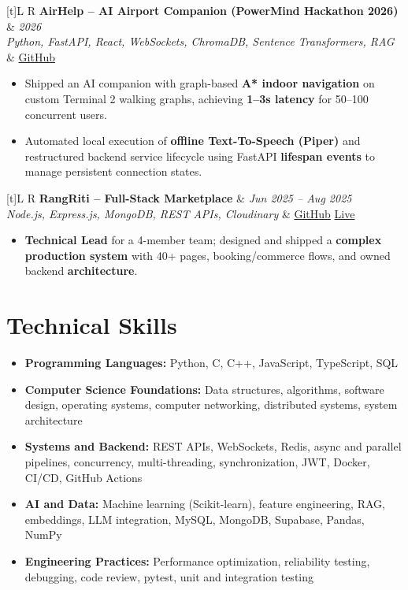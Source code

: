 \documentclass[a4paper,10pt]{article}
\newcommand{\resumeProject}[4]{
  \vspace{1mm}
  \noindent
  \begin{tabularx}{\textwidth}[t]{L R}
    \textbf{#1} & \textit{#3} \\
    \textit{#2} & #4 \\
  \end{tabularx}
  \vspace{-1mm}
}
\begin{document}
\resumeProject
  {AirHelp -- AI Airport Companion (PowerMind Hackathon 2026)}
  {Python, FastAPI, React, WebSockets, ChromaDB, Sentence Transformers, RAG}
  {2026}
  {\href{https://github.com/Ojas-Srivastava05/AirHelp-AI-Airport-Assistant}{GitHub}}
\begin{itemize}
  \item Shipped an AI companion with graph-based \textbf{A* indoor navigation} on custom Terminal 2 walking graphs, achieving \textbf{1--3s latency} for 50--100 concurrent users.
  \item Automated local execution of \textbf{offline Text-To-Speech (Piper)} and restructured backend service lifecycle using FastAPI \textbf{lifespan events} to manage persistent connection states.
\end{itemize}

\resumeProject
  {RangRiti -- Full-Stack Marketplace}
  {Node.js, Express.js, MongoDB, REST APIs, Cloudinary}
  {Jun 2025 -- Aug 2025}
  {\href{https://github.com/Ojas-Srivastava05/RangRiti}{GitHub} \textbar{} \href{https://rangriti.onrender.com/}{Live}}
\begin{itemize}
  \item \textbf{Technical Lead} for a 4-member team; designed and shipped a \textbf{complex production system} with 40+ pages, booking/commerce flows, and owned backend \textbf{architecture}.
\end{itemize}

\section{Technical Skills}
\small
\begin{itemize}[label={}]
  \item \textbf{Programming Languages:} Python, C, C++, JavaScript, TypeScript, SQL
  \item \textbf{Computer Science Foundations:} Data structures, algorithms, software design, operating systems, computer networking, distributed systems, system architecture
  \item \textbf{Systems and Backend:} REST APIs, WebSockets, Redis, async and parallel pipelines, concurrency, multi-threading, synchronization, JWT, Docker, CI/CD, GitHub Actions
  \item \textbf{AI and Data:} Machine learning (Scikit-learn), feature engineering, RAG, embeddings, LLM integration, MySQL, MongoDB, Supabase, Pandas, NumPy
  \item \textbf{Engineering Practices:} Performance optimization, reliability testing, debugging, code review, pytest, unit and integration testing
\end{itemize}
\end{document}
